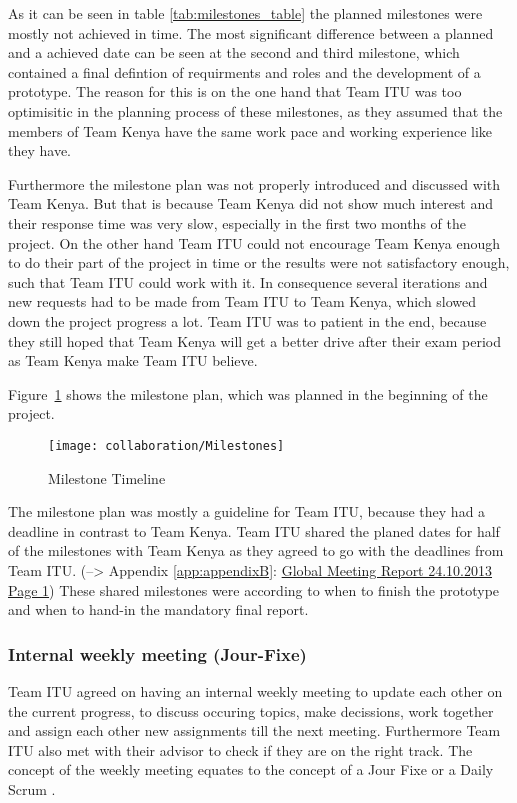 As it can be seen in table \ref{tab:milestones_table} the planned milestones were mostly not achieved in time. The most significant difference between a planned and a achieved date can be seen at the second and third milestone, which contained a final defintion of requirments and roles and the development of a prototype. The reason for this is on the one hand that Team ITU was too optimisitic in the planning process of these milestones, as they assumed that the members of Team Kenya have the same work pace and working experience like they have.

Furthermore the milestone plan was not properly introduced and discussed with Team Kenya. But that is because Team Kenya did not show much interest and their response time was very slow, especially in the first two months of the project. On the other hand Team ITU could not encourage Team Kenya enough to do their part of the project in time or the results were not satisfactory enough, such that Team ITU could work with it. In consequence several iterations and new requests had to be made from Team ITU to Team Kenya, which slowed down the project progress a lot. Team ITU was to patient in the end, because they still hoped that Team Kenya will get a better drive after their exam period as Team Kenya make Team ITU believe.

Figure~\ref{fig:milestones} shows the milestone plan, which was planned in the beginning of the project.

	\begin{figure}[htb]
		\centering
		\texttt{[image: collaboration/Milestones]}
		\caption{Milestone Timeline}
		\label{fig:milestones}
	\end{figure}

The milestone plan was mostly a guideline for Team ITU, because they had a deadline in contrast to Team Kenya. Team ITU shared the planed dates for half of the milestones with Team Kenya as they agreed to go with the deadlines from Team ITU. (--> Appendix \ref{app:appendixB}: \hyperlink{GSD20131024.1}{Global Meeting Report 24.10.2013 Page 1}) These shared milestones were according to when to finish the prototype and when to hand-in the mandatory final report.

\subsubsection{Internal weekly meeting (Jour-Fixe)}
Team ITU agreed on having an internal weekly meeting to update each other on the current progress, to discuss occuring topics, make decissions, work together and assign each other new assignments till the next meeting. Furthermore Team ITU also met with their advisor to check if they are on the right track. The concept of the weekly meeting equates to the concept of a Jour Fixe  or a Daily Scrum .

